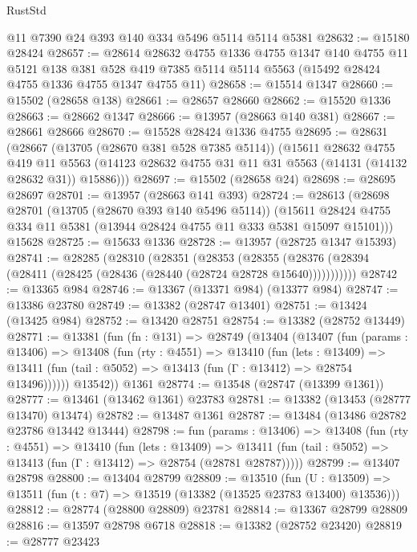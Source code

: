 \begin{lexlean}{RustStd}
\begin{coremodule}
    @11
    @7390
    @24
    @393
    @140
    @334
    @5496
    @5114
    @5114
    @5381
@28632 := @15180 @28424
@28657 := @28614
    @28632
    @4755
    @1336
    @4755
    @1347
    @140
    @4755
    @11
    @5121
    @138
    @381
    @528
    @419
    @7385
    @5114
    @5114
    @5563
    (@15492 @28424 @4755 @1336 @4755 @1347 @4755 @11)
@28658 := @15514 @1347
@28660 := @15502 (@28658 @138)
@28661 := @28657 @28660
@28662 := @15520 @1336
@28663 := @28662 @1347
@28666 := @13957 (@28663 @140 @381)
@28667 := @28661 @28666
@28670 := @15528 @28424 @1336 @4755
@28695 := @28631
    (@28667
      (@13705 (@28670 @381 @528 @7385 @5114))
      (@15611
        @28632
        @4755
        @419
        @11
        @5563
        (@14123 @28632 @4755 @31 @11 @31 @5563 (@14131 (@14132 @28632 @31)) @15886)))
@28697 := @15502 (@28658 @24)
@28698 := @28695 @28697
@28701 := @13957 (@28663 @141 @393)
@28724 := @28613
    (@28698
      @28701
      (@13705 (@28670 @393 @140 @5496 @5114))
      (@15611 @28424 @4755 @334 @11 @5381 (@13944 @28424 @4755 @11 @333 @5381 @15097 @15101)))
    @15628
@28725 := @15633 @1336
@28728 := @13957 (@28725 @1347 @15393)
@28741 := @28285
    (@28310
      (@28351
        (@28353
          (@28355 (@28376 (@28394 (@28411 (@28425 (@28436 (@28440 (@28724 @28728 @15640)))))))))))
@28742 := @13365 @984
@28746 := @13367 (@13371 @984) (@13377 @984)
@28747 := @13386 @23780
@28749 := @13382 (@28747 @13401)
@28751 := @13424 (@13425 @984)
@28752 := @13420 @28751
@28754 := @13382 (@28752 @13449)
@28771 := @13381
    (fun (fn : @131) =>
    @28749
      (@13404
        (@13407
          (fun (params : @13406) =>
          @13408
            (fun (rty : @4551) =>
            @13410
              (fun (lets : @13409) =>
              @13411 (fun (tail : @5052) => @13413 (fun (Γ : @13412) => @28754 @13496))))))
        @13542))
    @1361
@28774 := @13548 (@28747 (@13399 @1361))
@28777 := @13461 (@13462 @1361) @23783
@28781 := @13382 (@13453 (@28777 @13470) @13474)
@28782 := @13487 @1361
@28787 := @13484 (@13486 @28782 @23786 @13442 @13444)
@28798 := fun (params : @13406) =>
  @13408
    (fun (rty : @4551) =>
    @13410
      (fun (lets : @13409) =>
      @13411 (fun (tail : @5052) => @13413 (fun (Γ : @13412) => @28754 (@28781 @28787)))))
@28799 := @13407 @28798
@28800 := @13404 @28799
@28809 := @13510
    (fun (U : @13509) => @13511 (fun (t : @7) => @13519 (@13382 (@13525 @23783 @13400) @13536)))
@28812 := @28774 (@28800 @28809) @23781
@28814 := @13367 @28799 @28809
@28816 := @13597 @28798 @6718
@28818 := @13382 (@28752 @23420)
@28819 := @28777 @23423

\end{coremodule}
\end{lexlean}
